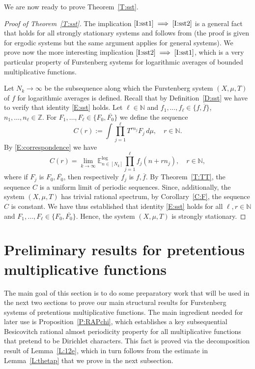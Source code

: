 \documentclass[11pt]{amsart}
\theoremstyle{definition}
\newcommand{\lE}{\mathbb{E}^{\log}}
\newcommand{\N}{{\mathbb N}}
\newcommand{\Z}{{\mathbb Z}}
\begin{document}
We are now ready to prove Theorem~\ref{T:sst}.
		\begin{proof}[Proof of Theorem~\ref{T:sst}]
			The implication $\eqref{I:sst1}\implies \eqref{I:sst2}$ is a general fact that holds for all strongly stationary systems and follows from \cite{Jen97} (the proof is given for ergodic systems but the same argument applies for general systems).
			We prove now the more interesting implication $\eqref{I:sst2}\implies \eqref{I:sst1}$, which is a very particular property of Furstenberg systems for logarithmic averages of bounded multiplicative functions.
			
			Let $N_k\to\infty$ be the subsequence along which the Furstenberg system $(X,\mu,T)$ of $f$ for logarithmic averages is defined.
			Recall that by Definition~\ref{D:sst} we have to verify that identity \eqref{E:sst} holds. 			
			Let $\ell\in \N$ and $f_1,\ldots, f_\ell\in \{ f,\overline{f}\}$, $n_1,\ldots, n_\ell\in \Z$.
			For  $F_1,\ldots, F_\ell\in \{F_0,\overline{F_0}\}$  we define the sequence
			\begin{equation}\label{E:fF}
				C(r):=	\int \prod_{j=1}^\ell T^{rn_j}F_j\, d\mu, \quad r\in \N.
			\end{equation}
		By \eqref{E:correspondence} we have
		$$
		C(r)=\lim_{k\to\infty}\lE_{n\in [N_k]}\prod_{j=1}^\ell f_j(n+rn_j), \quad r\in \N,
		$$
		where if $F_j$ is $F_0,\overline{F_0}$, then  respectively $f_j$ is $f,\overline{f}$.
		 	 By Theorem~\ref{T:TT}, the sequence $C$ is a uniform limit of periodic sequences. Since, additionally, the system $(X,\mu,T)$ has trivial rational spectrum, by Corollary~\ref{C:F}, the sequence $C$ is constant. We have thus established that identity \eqref{E:sst} holds for
			all $\ell,r\in \N$ and  $F_1,\ldots, F_\ell\in \{F_0,\overline{F_0}\}$. Hence, the system $(X,\mu,T)$ is strongly stationary.
		\end{proof}
		



	 	
	 	
\section{Preliminary results for  pretentious multiplicative functions}\label{S:PreliminariesPretentious}
	 	The main goal of this section is to do some preparatory work that will be used in the next two sections to prove our main structural results for Furstenberg systems of pretentious multiplicative functions. The main ingredient needed for later use is Proposition~\ref{P:RAPchi}, which establishes a key subsequential Besicovitch rational almost periodicity property for all multiplicative functions that pretend to be Dirichlet characters.  This fact is proved via the  decomposition result of Lemma~\ref{L:12e}, which in turn follows from the estimate in Lemma~\ref{L:thetap} that we prove in the next subsection.
	 	
\end{document}
